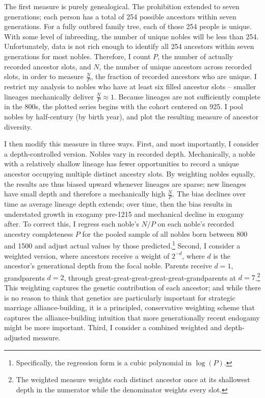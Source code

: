 \documentclass[12pt]{article}
\theoremstyle{definition}
\theoremstyle{remark}
\begin{document}
The first measure is purely genealogical. The prohibition extended to seven generations; each person has a total of 254 possible ancestors within seven generations. For a fully outbred family tree, each of those 254 people is unique. With some level of inbreeding, the number of unique nobles will be less than 254. Unfortunately, data is not rich enough to identify all 254 ancestors within seven generations for most nobles. Therefore, I count $P$, the number of actually recorded ancestor slots, and $N$, the number of unique ancestors across recorded slots, in order to measure $\tfrac{N}{P}$, the fraction of recorded ancestors who are unique. I restrict my analysis to nobles who have at least six filled ancestor slots -- smaller lineages mechanically deliver $\tfrac{N}{P} \approx 1$. Because lineages are not sufficiently complete in the 800s, the plotted series begins with the cohort centered on 925. I pool nobles by half-century (by birth year), and plot the resulting measure of ancestor diversity.

I then modify this measure in three ways. First, and most importantly, I consider a depth-controlled version. Nobles vary in recorded depth. Mechanically, a noble with a relatively shallow lineage has fewer opportunities to record a unique ancestor occupying multiple distinct ancestry slots. By weighting nobles equally, the results are thus biased upward whenever lineages are sparse; new lineages have small depth and therefore a mechanically high $\tfrac{N}{P}$. The bias declines over time as average lineage depth extends; over time, then the bias results in understated growth in exogamy pre-1215 and mechanical decline in exogamy after. To correct this, I regress each noble's $N/P$ on each noble's recorded ancestry completeness $P$ for the pooled sample of all nobles born between 800 and 1500 and adjust actual values by those predicted.\footnote{Specifically, the regression form is a cubic polynomial in $\log(P)$.} Second, I consider a weighted version, where ancestors receive a weight of $2^{-d}$, where $d$ is the ancestor's generational depth from the focal noble. Parents receive $d = 1$, grandparents $d = 2$, through great-great-great-great-great-grandparents at $d = 7$.\footnote{The weighted measure weights each distinct ancestor once at its shallowest depth in the numerator while the denominator weights every slot.} This weighting captures the genetic contribution of each ancestor; and while there is no reason to think that genetics are particularly important for strategic marriage alliance-building, it is a principled, conservative weighting scheme that captures the alliance-building intuition that more generationally recent endogamy might be more important. Third, I consider a combined weighted and depth-adjusted measure.
\end{document}
